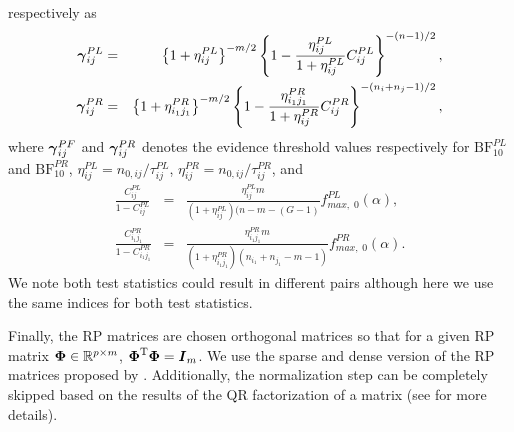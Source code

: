 \documentclass[times,sort&compress,3p]{elsarticle}
\theoremstyle{plain}%
\theoremstyle{definition}
\def\be{\begin{eqnarray}}
\def\ee{\end{eqnarray}}
\def\trans{^{\rm T}}
\newcommand{\uF}       {\mbox{\boldmath$F$}}
\newcommand{\uI}       {\mbox{\boldmath$I$}}
\newcommand{\ugamma}            {\mbox{\boldmath$\gamma$}}
\newcommand{\uPhi}              {\mbox{\boldmath$\Phi$}}
\begin{document}
respectively as
\be
\ugamma^{PL}_{ij} &=& \left\{ 1 + \eta^{PL}_{ij}\right\}^{-m/2}\left\{ 1 - \frac{\eta^{PL}_{ij}}{1 + \eta^{PL}_{ij}} C^{PL}_{ij} \right\}^{-(n -1)/2}, \nonumber \\
\ugamma^{PR}_{ij} &=& \left\{ 1 + \eta^{PR}_{i_1j_1}\right\}^{-m/2}\left\{ 1 - \frac{\eta^{PR}_{i_1j_1}}{1 + \eta^{PR}_{ij}} C^{PR}_{ij} \right\}^{-(n_i+n_j -1)/2}, \nonumber
\ee
where $\ugamma^{PF}_{ij}$ and $\ugamma^{PR}_{ij}$ denotes the evidence threshold values respectively for $\text{BF}_{10}^{PL}$ and $\text{BF}^{PR}_{10}$, $\eta^{PL}_{ij} = n_{0,ij}/ \tau^{PL}_{ij}$, $\eta^{PR}_{ij} = n_{0,ij}/ \tau^{PR}_{ij}$,
and 
\be
\frac{C^{PL}_{ij}}{1 -C^{PL}_{ij}} &=& \frac{ \eta^{PL}_{ij} m}{(1+ \eta^{PL}_{ij})(n - m -(G-1)}f^{PL}_{max,\;0}(\alpha), \nonumber \\
\frac{C^{PR}_{i_1 j_1}}{1 - C^{PR}_{i_1j_1}} &=& \frac{ \eta^{PR}_{i_1 j_1} m}{(1+ \eta^{PR}_{i_1 j_1})(n_{i_1} +n_{j_1} - m -1)}f^{PR}_{max,\;0}(\alpha). \nonumber 
\ee
We note both test statistics could result in different pairs although here we use the same indices for both test statistics. 

Finally, the RP matrices are chosen orthogonal matrices so that for a given RP matrix $\uPhi \in \mathbb{R}^{p \times m}$,  $\uPhi\trans\uPhi = \uI_{m}$. We use the sparse and dense version of the RP matrices proposed by \cite{srivastava2014raptt}. Additionally, the normalization step can be completely skipped based on the results of the QR factorization of a matrix (see \cite{zoh2018powerful} for more details).
\end{document}
